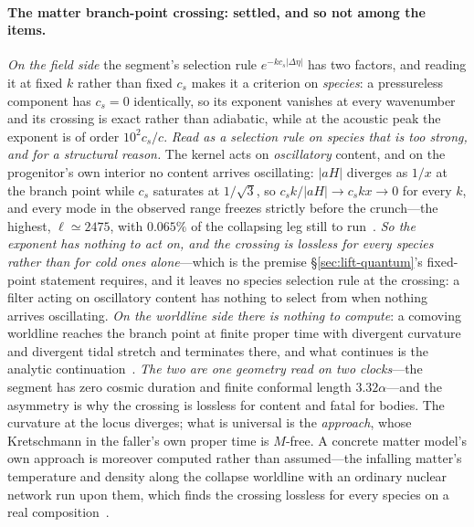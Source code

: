 \documentclass[11pt,a4paper]{article}
\theoremstyle{plain}
\theoremstyle{definition}
\theoremstyle{remark}
\begin{document}
\paragraph{The matter branch-point crossing: settled, and so not among the items.} \emph{On the field side} the segment's selection rule $e^{-kc_s\lvert\Delta\eta\rvert}$ has two factors, and reading it at fixed $k$ rather than fixed $c_s$ makes it a criterion on \emph{species}: a pressureless component has $c_s=0$ identically, so its exponent vanishes at every wavenumber and its crossing is exact rather than adiabatic, while at the acoustic peak the exponent is of order $10^{2}c_s/c$. \emph{Read as a selection rule on species that is too strong, and for a structural reason.} The kernel acts on \emph{oscillatory} content, and on the progenitor's own interior no content arrives oscillating: $|aH|$ diverges as $1/x$ at the branch point while $c_s$ saturates at $1/\sqrt3$, so $c_sk/|aH|\to c_skx\to0$ for every $k$, and every mode in the observed range freezes strictly before the crunch---the highest, $\ell\simeq2475$, with $0.065\%$ of the collapsing leg still to run~. \emph{So the exponent has nothing to act on, and the crossing is lossless for every species rather than for cold ones alone}---which is the premise \S\ref{sec:lift-quantum}'s fixed-point statement requires, and it leaves no species selection rule at the crossing: a filter acting on oscillatory content has nothing to select from when nothing arrives oscillating. \emph{On the worldline side there is nothing to compute}: a comoving worldline reaches the branch point at finite proper time with divergent curvature and divergent tidal stretch and terminates there, and what continues is the analytic continuation~\cite{JanzenCircle}. \emph{The two are one geometry read on two clocks}---the segment has zero cosmic duration and finite conformal length $3.32\alpha$---and the asymmetry is why the crossing is lossless for content and fatal for bodies. The curvature at the locus diverges; what is universal is the \emph{approach}, whose Kretschmann in the faller's own proper time is $M$-free. A concrete matter model's own approach is moreover computed rather than assumed---the infalling matter's temperature and density along the collapse worldline with an ordinary nuclear network run upon them, which finds the crossing lossless for every species on a real composition~\cite{JanzenCosmogenesis}.
\end{document}
